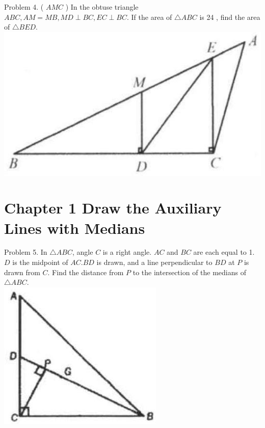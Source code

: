 \documentclass[10pt]{article}
\begin{document}
Problem 4. ( \(A M C\) ) In the obtuse triangle \(A B C, A M=M B, M D \perp B C, E C \perp B C\). If the area of \(\triangle A B C\) is 24 , find the area of \(\triangle B E D\).\\
\includegraphics[max width=\textwidth, center]{2025_04_17_97bc1f7e44d93c271a88g-015}

\section*{Chapter 1 Draw the Auxiliary Lines with Medians}
Problem 5. In \(\triangle A B C\), angle \(C\) is a right angle. \(A C\) and \(B C\) are each equal to 1. \(D\) is the midpoint of \(A C . B D\) is drawn, and a line perpendicular to \(B D\) at \(P\) is drawn from \(C\). Find the distance from \(P\) to the intersection of the medians of \(\triangle A B C\).\\
\includegraphics[max width=\textwidth, center]{2025_04_17_97bc1f7e44d93c271a88g-016(4)}
\end{document}

